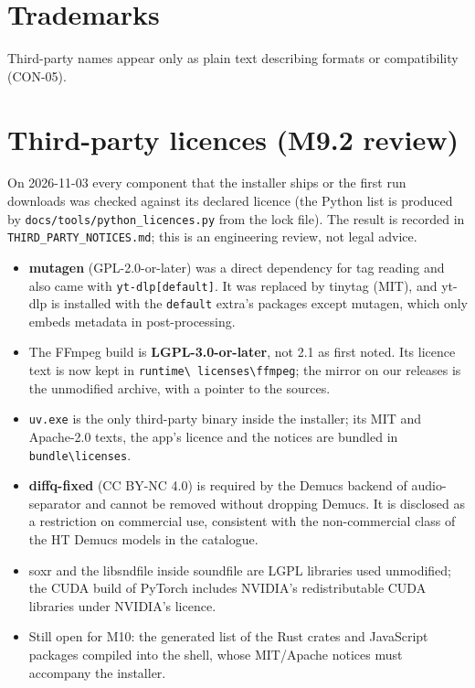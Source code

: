 \documentclass{covermaker}
\begin{document}
\section{Trademarks}
Third-party names appear only as plain text describing formats or compatibility
(CON-05).

\section{Third-party licences (M9.2 review)}
On 2026-11-03 every component that the installer ships or the first run
downloads was checked against its declared licence (the Python list is
produced by \texttt{docs/tools/python\_licences.py} from the lock file). The
result is recorded in \texttt{THIRD\_PARTY\_NOTICES.md}; this is an
engineering review, not legal advice.
\begin{itemize}
  \item \textbf{mutagen} (GPL-2.0-or-later) was a direct dependency for tag
  reading and also came with \texttt{yt-dlp[default]}. It was replaced by
  tinytag (MIT), and yt-dlp is installed with the \texttt{default} extra's
  packages except mutagen, which only embeds metadata in post-processing.
  \item The FFmpeg build is \textbf{LGPL-3.0-or-later}, not 2.1 as first
  noted. Its licence text is now kept in \texttt{runtime\textbackslash
  licenses\textbackslash ffmpeg}; the mirror on our releases is the unmodified
  archive, with a pointer to the sources.
  \item \texttt{uv.exe} is the only third-party binary inside the installer;
  its MIT and Apache-2.0 texts, the app's licence and the notices are bundled
  in \texttt{bundle\textbackslash licenses}.
  \item \textbf{diffq-fixed} (CC BY-NC 4.0) is required by the Demucs backend
  of audio-separator and cannot be removed without dropping Demucs. It is
  disclosed as a restriction on commercial use, consistent with the
  non-commercial class of the HT Demucs models in the catalogue.
  \item soxr and the libsndfile inside soundfile are LGPL libraries used
  unmodified; the CUDA build of PyTorch includes NVIDIA's redistributable CUDA
  libraries under NVIDIA's licence.
  \item Still open for M10: the generated list of the Rust crates and
  JavaScript packages compiled into the shell, whose MIT/Apache notices must
  accompany the installer.
\end{itemize}
\end{document}

